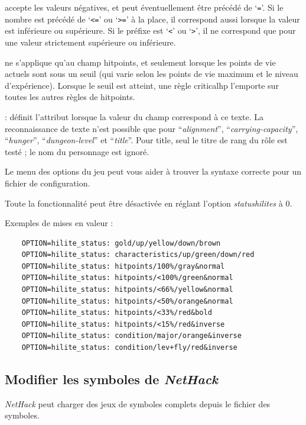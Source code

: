 \documentclass[titlepage]{article}
\begin{document}
\begin{description}[font=\mdseries\ttfamily]
accepte les valeurs négatives, et peut éventuellement être précédé de `\texttt{=}'.
Si le nombre est précédé de `\texttt{<=}' ou `\texttt{>=}' à la place,
il correspond aussi lorsque la valeur est inférieure ou supérieure.
Si le préfixe est `\texttt{<}' ou `\texttt{>}', il ne correspond que pour une valeur
strictement supérieure ou inférieure.
\item[criticalhp] ne s'applique qu'au champ hitpoints, et seulement
lorsque les points de vie actuels sont sous un seuil (qui varie selon les
points de vie maximum et le niveau d'expérience).
Lorsque le seuil est atteint, une règle criticalhp l'emporte sur toutes les
autres règles de hitpoints.
\item[texte] : définit l'attribut lorsque la valeur du champ
correspond à ce texte.
La reconnaissance de texte n'est possible que pour ``\textit{alignment}'',
``\textit{carrying-capacity}'', ``\textit{hunger}'', ``\textit{dungeon-level}''
et ``\textit{title}''.
Pour title, seul le titre de rang du rôle
est testé ; le nom du personnage est ignoré.
\end{description}

Le menu des options du jeu peut vous aider à trouver la syntaxe correcte pour un
fichier de configuration.

Toute la fonctionnalité peut être désactivée en réglant l'option \textit{statushilites} à 0.

Exemples de mises en valeur :
\begin{verbatim}
    OPTION=hilite_status: gold/up/yellow/down/brown
    OPTION=hilite_status: characteristics/up/green/down/red
    OPTION=hilite_status: hitpoints/100%/gray&normal
    OPTION=hilite_status: hitpoints/<100%/green&normal
    OPTION=hilite_status: hitpoints/<66%/yellow&normal
    OPTION=hilite_status: hitpoints/<50%/orange&normal
    OPTION=hilite_status: hitpoints/<33%/red&bold
    OPTION=hilite_status: hitpoints/<15%/red&inverse
    OPTION=hilite_status: condition/major/orange&inverse
    OPTION=hilite_status: condition/lev+fly/red&inverse
\end{verbatim}

\subsection*{Modifier les symboles de \textit{NetHack}}

\textit{NetHack} peut charger des jeux de symboles complets depuis le fichier des symboles.
\end{document}
